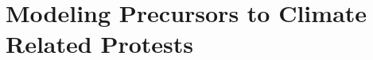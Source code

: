 \chapter{Modeling Precursors to Climate Related Protests}
\label{ch:climate}


\begingroup
\newcommand{\score}{S}
\newcommand{\myalgo}{CoolAlgo}






\endgroup
